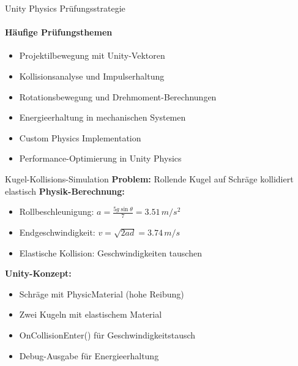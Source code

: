 \begin{KR}{Unity Physics Prüfungsstrategie}
    \paragraph{Häufige Prüfungsthemen}
    \begin{itemize}
        \item Projektilbewegung mit Unity-Vektoren
        \item Kollisionsanalyse und Impulserhaltung
        \item Rotationsbewegung und Drehmoment-Berechnungen
        \item Energieerhaltung in mechanischen Systemen
        \item Custom Physics Implementation
        \item Performance-Optimierung in Unity Physics
    \end{itemize}
\end{KR}

\begin{example2}{Kugel-Kollisions-Simulation}
    \textbf{Problem:} Rollende Kugel auf Schräge kollidiert elastisch
    \tcblower
    \textbf{Physik-Berechnung:}
    \begin{itemize}
        \item Rollbeschleunigung: $a = \frac{5g\sin\theta}{7} = 3.51 \, m/s^2$
        \item Endgeschwindigkeit: $v = \sqrt{2ad} = 3.74 \, m/s$
        \item Elastische Kollision: Geschwindigkeiten tauschen
    \end{itemize}
    
    \textbf{Unity-Konzept:}
    \begin{itemize}
        \item Schräge mit PhysicMaterial (hohe Reibung)
        \item Zwei Kugeln mit elastischem Material
        \item OnCollisionEnter() für Geschwindigkeitstausch
        \item Debug-Ausgabe für Energieerhaltung
    \end{itemize}
\end{example2}

